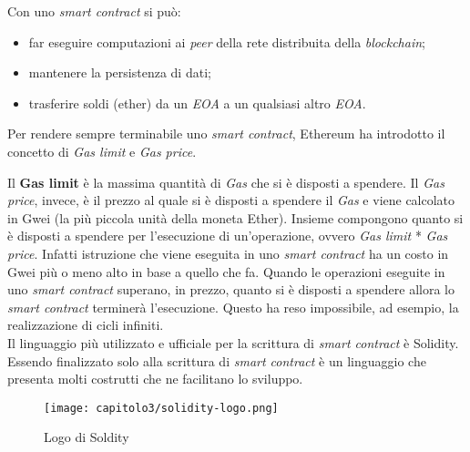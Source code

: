 Con uno \textit{smart contract} si può:
\begin{itemize}
  \item far eseguire computazioni ai \textit{peer} della rete distribuita della \textit{blockchain};
  \item mantenere la persistenza di dati;
  \item trasferire soldi (ether) da un \textit{EOA} a un qualsiasi altro \textit{EOA}.
\end{itemize}

Per rendere sempre terminabile uno \textit{smart contract}, Ethereum ha introdotto il concetto di \textit{Gas limit} e \textit{Gas price}.

Il \textbf{Gas limit} è la massima quantità di \textit{Gas} che si è disposti a spendere. Il \textit{Gas price}, invece, è il prezzo al quale si è disposti a spendere il \textit{Gas} e viene calcolato in Gwei (la più piccola unità della moneta Ether). Insieme compongono quanto si è disposti a spendere per l'esecuzione di un'operazione, ovvero \textit{Gas limit} * \textit{Gas price}. Infatti istruzione che viene eseguita in uno \textit{smart contract} ha un costo in Gwei più o meno alto in base a quello che fa. Quando le operazioni eseguite in uno \textit{smart contract} superano, in prezzo, quanto si è disposti a spendere allora lo \textit{smart contract} terminerà l'esecuzione. Questo ha reso impossibile, ad esempio, la realizzazione di cicli infiniti.\\

Il linguaggio più utilizzato e ufficiale per la scrittura di \textit{smart contract} è Solidity. Essendo finalizzato solo alla scrittura di \textit{smart contract} è un linguaggio che presenta molti costrutti che ne facilitano lo sviluppo.

\begin{figure}[h!]
  \centering
  \texttt{[image: capitolo3/solidity-logo.png]}
  \caption{Logo di Soldity}
\end{figure}

